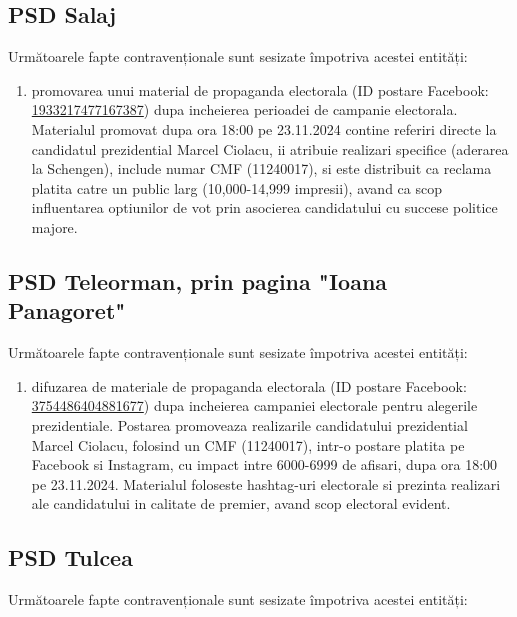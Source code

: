 \documentclass[a4paper,12pt]{article}
\begin{document}
\vspace{0.5cm}

\subsection{PSD Salaj}
Următoarele fapte contravenționale sunt sesizate împotriva acestei entități:

\begin{enumerate}[leftmargin=*, label=\arabic*.)]
    \item promovarea unui material de propaganda electorala (ID postare Facebook: \href{https://www.facebook.com/ads/library/?id=1933217477167387}{1933217477167387}) dupa incheierea perioadei de campanie electorala. Materialul promovat dupa ora 18:00 pe 23.11.2024 contine referiri directe la candidatul prezidential Marcel Ciolacu, ii atribuie realizari specifice (aderarea la Schengen), include numar CMF (11240017), si este distribuit ca reclama platita catre un public larg (10,000-14,999 impresii), avand ca scop influentarea optiunilor de vot prin asocierea candidatului cu succese politice majore.
\end{enumerate}

\vspace{0.5cm}

\subsection{PSD Teleorman, prin pagina "Ioana Panagoret"}
Următoarele fapte contravenționale sunt sesizate împotriva acestei entități:

\begin{enumerate}[leftmargin=*, label=\arabic*.)]
    \item difuzarea de materiale de propaganda electorala (ID postare Facebook: \href{https://www.facebook.com/ads/library/?id=3754486404881677}{3754486404881677}) dupa incheierea campaniei electorale pentru alegerile prezidentiale. Postarea promoveaza realizarile candidatului prezidential Marcel Ciolacu, folosind un CMF (11240017), intr-o postare platita pe Facebook si Instagram, cu impact intre 6000-6999 de afisari, dupa ora 18:00 pe 23.11.2024. Materialul foloseste hashtag-uri electorale si prezinta realizari ale candidatului in calitate de premier, avand scop electoral evident.
\end{enumerate}

\vspace{0.5cm}

\subsection{PSD Tulcea}
Următoarele fapte contravenționale sunt sesizate împotriva acestei entități:
\end{document}
